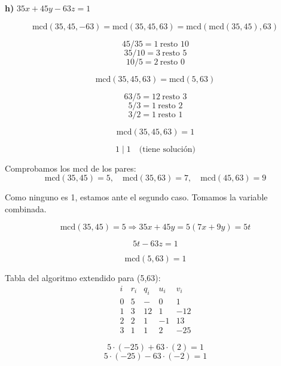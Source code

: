 \documentclass[a4paper,12pt]{article}
\begin{document}
\begin{ejercicio}[title=Ejercicio 9]

\textbf{h) } $35x + 45y - 63z = 1$

\vspace{0.5em}

\[
\text{mcd}(35,45,-63) = \text{mcd}(35,45,63) = \text{mcd}(\text{mcd}(35,45),63)
\]

\[
45 / 35 = 1 \ \text{resto } 10
\]
\[
35 / 10 = 3 \ \text{resto } \boxed{5}
\]
\[
10 / 5 = 2 \ \text{resto } 0
\]

\[
\text{mcd}(35,45,63) = \text{mcd}(5,63)
\]

\[
63 / 5 = 12 \ \text{resto } 3
\]
\[
5 / 3 = 1 \ \text{resto } 2
\]
\[
3 / 2 = 1 \ \text{resto } \boxed{1}
\]

\[
\text{mcd}(35,45,63) = \boxed{1}
\]

\[
1 \mid 1 \quad \text{(tiene solución)}
\]

\vspace{0.5em}

Comprobamos los mcd de los pares:
\[
\text{mcd}(35,45) = 5, \quad \text{mcd}(35,63) = 7, \quad \text{mcd}(45,63) = 9
\]

Como ninguno es 1, estamos ante el segundo caso. Tomamos la variable combinada.

\[
\text{mcd}(35,45) = 5\Rightarrow 35x + 45y = 5(7x + 9y) = 5t
\]

\[
5t - 63z = 1
\]

\[
\text{mcd}(5,63) = 1
\]

\vspace{0.5em}

Tabla del algoritmo extendido para (5,63):
\[
\begin{array}{c|c|c|c|c}
i & r_i & q_i & u_i & v_i\\
\hline
0 & 5 & - & 0 & 1\\
1 & 3 & 12 & 1 & -12\\
2 & 2 & 1 & -1 & 13\\
3 & \boxed{1} & 1 & 2 & -25
\end{array}
\]

\[
5 \cdot (-25) + 63 \cdot (2) = \boxed{1}
\]
\[
5 \cdot (-25) - 63 \cdot (-2) = \boxed{1}
\]

\end{ejercicio}
\end{document}
